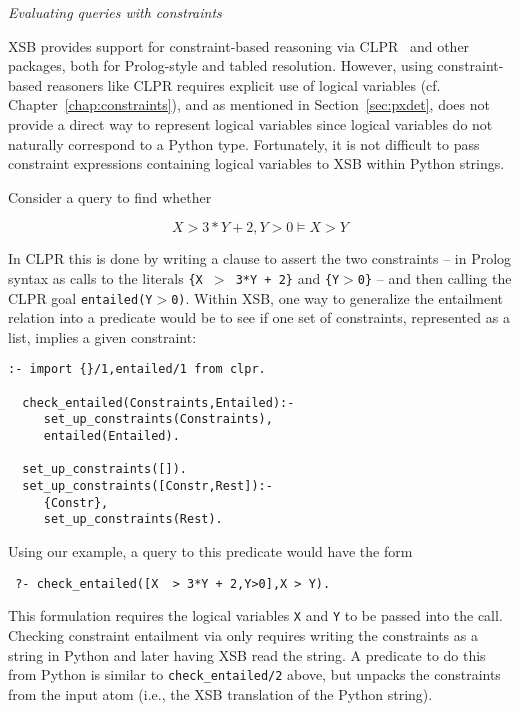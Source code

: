 \begin{example} \rm {\it Evaluating queries with constraints} \label{ex:connstraints}

  XSB provides support for constraint-based reasoning via
  CLPR~\cite{Holz95} and other packages, both for Prolog-style and
  tabled resolution.  However, using constraint-based reasoners like
  CLPR requires explicit use of logical variables
  (cf. Chapter~\ref{chap:constraints}), and as mentioned in
  Section~\ref{sec:pxdet}, \px{} does not provide a direct way to
  represent logical variables since logical variables do not naturally
  correspond to a Python type.  Fortunately, it is not difficult to
  pass constraint expressions containing logical variables to XSB
  within Python strings.

  Consider a query to find whether 

  \[X  > 3*Y + 2,Y>0 \models X > Y\]

\noindent  
  In CLPR this is done by writing a clause to assert the two
  constraints -- in Prolog syntax as calls to the literals {\tt \{X
    $>$ 3*Y + 2\}} and {\tt \{Y$>$0\}} -- and then calling the CLPR
  goal {\tt entailed(Y$>$0)}.  Within XSB, one way to generalize the
  entailment relation into a predicate would be to see if one set of
  constraints, represented as a list, implies a given constraint:

{\small  
\begin{verbatim}  
:- import {}/1,entailed/1 from clpr.

  check_entailed(Constraints,Entailed):- 
     set_up_constraints(Constraints),
     entailed(Entailed).

  set_up_constraints([]).
  set_up_constraints([Constr,Rest]):- 
     {Constr},
     set_up_constraints(Rest).
\end{verbatim}
}
\noindent
Using our example, a query to this predicate would have the form

\begin{verbatim}
 ?- check_entailed([X  > 3*Y + 2,Y>0],X > Y).
\end{verbatim}
\noindent
This formulation requires the logical variables {\tt X} and {\tt Y} to
be passed into the call.  Checking constraint entailment via \px{}
only requires writing the constraints as a string in Python and later
having XSB read the string.  A predicate to do this from Python is
similar to {\tt check\_entailed/2} above, but unpacks the constraints
from the input atom (i.e., the XSB translation of the Python string).


\end{example}
